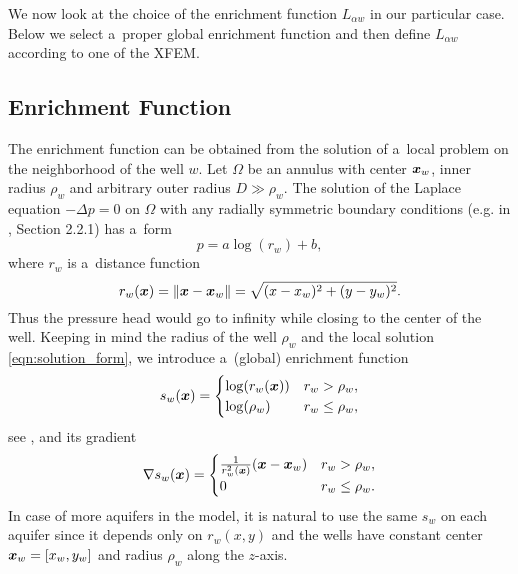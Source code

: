 We now look at the choice of the enrichment function $L_{\alpha w}$ in our particular case.
Below we select a~proper global enrichment function and then define $L_{\alpha w}$ according
to one of the XFEM.



\subsection{Enrichment Function}
\label{sec:enrichment_func}
The enrichment function can be obtained from the solution of a~local problem on the neighborhood of the well $w$.
Let $\Omega$ be an annulus with center $\mathbf{\boldsymbol{x}}_w$, inner radius $\rho_w$ and arbitrary outer radius $D \gg \rho_w$.
The solution of the Laplace equation $-\Delta p = 0$ on $\Omega$ with any radially symmetric boundary conditions
(e.g. in \cite{evans_partial_2010}, Section 2.2.1) has a~form
%
\begin{equation} \label{eqn:solution_form}
  p = a \log(r_w)+b, %
\end{equation}
where $r_w$ is a~distance function
\begin{equation} \label{eqn:distance}
r_w(\mathbf{\boldsymbol{x}}) = \|\mathbf{\boldsymbol{x}} - \mathbf{\boldsymbol{x}}_w\|= \sqrt{(x-x_w)^2+(y-y_w)^2}.
\end{equation}
%
Thus the pressure head would go to infinity while closing to the center of the well.
Keeping in mind the radius of the well $\rho_w$ and the local solution \eqref{eqn:solution_form}, 
we introduce a~(global) enrichment function
%
\begin{equation}
\label{eqn:enrich_func}
s_w(\mathbf{\boldsymbol{x}}) = 
  \begin{cases}
  \log(r_w(\mathbf{\boldsymbol{x}})) & r_w > \rho_w,\\
  \log(\rho_w) & r_w \le \rho_w,\\
  \end{cases}
\end{equation}
see , and its gradient
\begin{equation} \label{eqn:enrich_grad}
\nabla s_w(\mathbf{\boldsymbol{x}}) = 
  \begin{cases}  
    \frac{1}{r_w^2(\mathbf{\boldsymbol{x}})}(\mathbf{\boldsymbol{x}} - \mathbf{\boldsymbol{x}}_w) & r_w > \rho_w, \\
    0 & r_w \leq \rho_w.
  \end{cases}
\end{equation}
In case of more aquifers in the model, it is natural to use the same $s_w$ on each aquifer 
since it depends only on $r_w(x,y)$ and the wells have constant center $\mathbf{\boldsymbol{x}}_w=[x_w, y_w]$ and radius $\rho_w$ along the $z$-axis.

